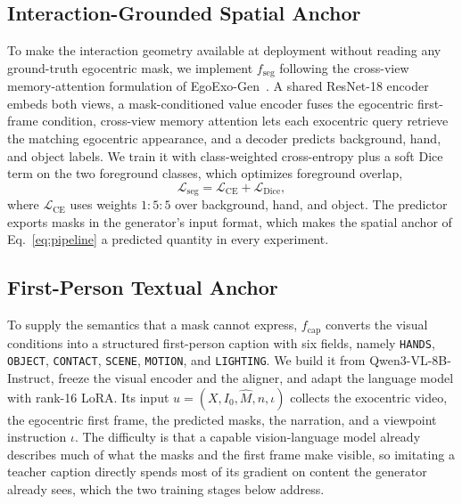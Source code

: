 \documentclass{article}
\begin{document}
\subsection{Interaction-Grounded Spatial Anchor}
\label{sec:seg}

To make the interaction geometry available at deployment without reading any
ground-truth egocentric mask, we implement $f_{\mathrm{seg}}$ following the
cross-view memory-attention formulation of EgoExo-Gen~\citep{xu2025egoexogen}. A
shared ResNet-18
encoder embeds both views, a mask-conditioned value encoder fuses the egocentric
first-frame condition, cross-view memory attention lets each exocentric query
retrieve the matching egocentric appearance, and a decoder predicts background,
hand, and object labels. We train it with class-weighted cross-entropy plus a soft Dice term on the
two foreground classes, which optimizes foreground overlap,
\begin{equation}
\mathcal{L}_{\mathrm{seg}} = \mathcal{L}_{\mathrm{CE}}
+ \mathcal{L}_{\mathrm{Dice}},
\label{eq:seg}
\end{equation}
where $\mathcal{L}_{\mathrm{CE}}$ uses weights $1{:}5{:}5$ over background,
hand, and object. The predictor exports masks in the generator's input format, which makes the
spatial anchor of Eq.~\ref{eq:pipeline} a predicted quantity in every
experiment.

\subsection{First-Person Textual Anchor}
\label{sec:cap}

To supply the semantics that a mask cannot express, $f_{\mathrm{cap}}$
converts the visual conditions into a structured first-person caption with six
fields, namely \texttt{HANDS}, \texttt{OBJECT}, \texttt{CONTACT},
\texttt{SCENE}, \texttt{MOTION}, and \texttt{LIGHTING}. We build it from Qwen3-VL-8B-Instruct,
freeze the visual encoder and the aligner, and adapt the language model with
rank-16 LoRA. Its input $u=(X,I_0,\widehat{M},n,\iota)$ collects the exocentric
video, the egocentric first frame, the predicted masks, the narration, and a
viewpoint instruction $\iota$. The difficulty is that a capable vision-language
model already describes much of what the masks and the first frame make visible,
so imitating a teacher caption directly spends most of its gradient on content the
generator already sees, which the two training stages below address.
\end{document}
